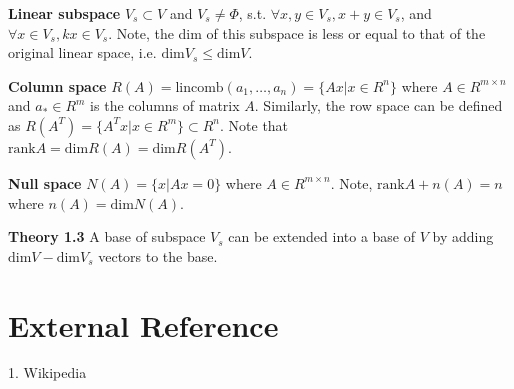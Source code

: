 {\bf Linear subspace} $V_s \subset V$ and $V_s \neq \Phi$, s.t.
$\forall x, y \in V_s, x+y\in V_s$, and $\forall x\in V_s, kx \in V_s$.
Note, the dim of this subspace is less or equal to that of the original
linear space, i.e. $\text{dim} V_s \leq \text{dim} V$.

{\bf Column space} $R(A) = \text{lincomb}(a_1,\ldots,a_n) = \{Ax|x\in R^n\}$
where $A\in R^{m\times n}$ and $a_* \in R^m$ is the columns of matrix $A$.
Similarly, the row space can be defined as $R(A^T) = \{A^Tx|x\in R^m\} \subset R^n$.
Note that $\text{rank} A = \text{dim} R(A) = \text{dim} R(A^T)$.

{\bf Null space} $N(A) = \{x|Ax=0\}$ where $A\in R^{m\times n}$. Note,
$\text{rank} A + n(A) = n$ where $n(A) = \text{dim} N(A)$.

{\bf Theory 1.3} A base of subspace $V_s$ can be extended into a base of $V$
by adding $\text{dim} V - \text{dim} V_s$ vectors to the base.

\appendix

\section{External Reference}

1. Wikipedia
